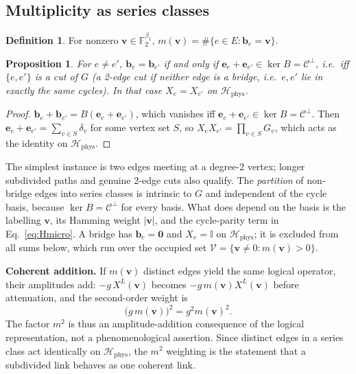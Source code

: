 \documentclass[10pt,twocolumn]{article}
\newtheorem{proposition}{Proposition}
\theoremstyle{definition}
\newtheorem{definition}{Definition}
\newcommand{\F}{\mathbb{F}_2}
\newcommand{\Hphys}{\mathcal{H}_{\mathrm{phys}}}
\newcommand{\XL}{X^{L}}
\begin{document}
\subsection{Multiplicity as series classes}
\begin{definition}
For nonzero $\mathbf v\in\F^{\beta_1}$, $m(\mathbf v)=\#\{e\in E:\mathbf b_e=\mathbf v\}$.
\end{definition}
\begin{proposition}\label{prop:series}
For $e\neq e'$, $\mathbf b_e=\mathbf b_{e'}$ if and only if $\mathbf e_e+\mathbf e_{e'}\in\ker B=\mathcal C^\perp$, i.e.\ iff $\{e,e'\}$ is a cut of $G$ (a 2-edge cut if neither edge is a bridge, i.e.\ $e,e'$ lie in exactly the same cycles). In that case $X_e=X_{e'}$ on $\Hphys$.
\end{proposition}
\begin{proof}
$\mathbf b_e+\mathbf b_{e'}=B(\mathbf e_e+\mathbf e_{e'})$, which vanishes iff $\mathbf e_e+\mathbf e_{e'}\in\ker B=\mathcal C^\perp$. Then $\mathbf e_e+\mathbf e_{e'}=\sum_{v\in S}\delta_v$ for some vertex set $S$, so $X_eX_{e'}=\prod_{v\in S}G_v$, which acts as the identity on $\Hphys$.
\end{proof}
The simplest instance is two edges meeting at a degree-2 vertex; longer subdivided paths and genuine 2-edge cuts also qualify. The \emph{partition} of non-bridge edges into series classes is intrinsic to $G$ and independent of the cycle basis, because $\ker B=\mathcal C^\perp$ for every basis. What does depend on the basis is the labelling $\mathbf v$, its Hamming weight $|\mathbf v|$, and the cycle-parity term in Eq.~\eqref{eq:Hmicro}. A bridge has $\mathbf b_e=\mathbf 0$ and $X_e=\mathbb I$ on $\Hphys$; it is excluded from all sums below, which run over the occupied set $\mathcal V=\{\mathbf v\neq0:m(\mathbf v)>0\}$.

\textbf{Coherent addition.} If $m(\mathbf v)$ distinct edges yield the same logical operator, their amplitudes add: $-g\,\XL(\mathbf v)$ becomes $-g\,m(\mathbf v)\XL(\mathbf v)$ before attenuation, and the second-order weight is
\begin{equation}
\bigl(g\,m(\mathbf v)\bigr)^2=g^2m(\mathbf v)^2. \label{eq:m2}
\end{equation}
The factor $m^2$ is thus an amplitude-addition consequence of the logical representation, not a phenomenological assertion. Since distinct edges in a series class act identically on $\Hphys$, the $m^2$ weighting is the statement that a subdivided link behaves as one coherent link.
\end{document}
